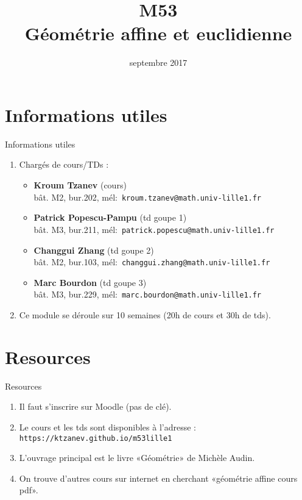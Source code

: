 \documentclass{m53beamer}
\title{M53\\Géométrie affine et euclidienne}
\date{septembre 2017}
\begin{document}
\begin{frame}
  \titlepage
\end{frame}

\section{Informations utiles}
\begin{frame}{Informations utiles}
  \begin{enumerate}[<+(1)->]
    \item Chargés de cours/TDs :
          \begin{itemize}
            \item \textbf{Kroum Tzanev} (cours)\\
              bât. M2, bur.202, mél:~\texttt{kroum.tzanev@math.univ-lille1.fr}
            \item \textbf{Patrick Popescu-Pampu} (td goupe 1)\\
              bât. M3, bur.211, mél:~\texttt{patrick.popescu@math.univ-lille1.fr}
            \item \textbf{Changgui Zhang} (td goupe 2)\\
              bât. M2, bur.103, mél:~\texttt{changgui.zhang@math.univ-lille1.fr}
            \item \textbf{Marc Bourdon} (td goupe 3)\\
              bât. M3, bur.229, mél:~\texttt{marc.bourdon@math.univ-lille1.fr}
          \end{itemize}
    \item Ce module se déroule sur 10 semaines (20h de cours et 30h de tds).
  \end{enumerate}
\end{frame}

\section{Resources}
\begin{frame}{Resources}
  \begin{enumerate}[<+(1)->]
    \item Il faut s'inscrire sur Moodle (pas de clé).
    \item Le cours et les tds sont disponibles à l'adresse :
      \texttt{https://ktzanev.github.io/m53lille1}
    \item L'ouvrage principal est le livre «Géométrie» de Michèle Audin.
    \item On trouve d'autres cours sur internet en cherchant «géométrie affine cours pdf».
  \end{enumerate}
\end{frame}
\end{document}
